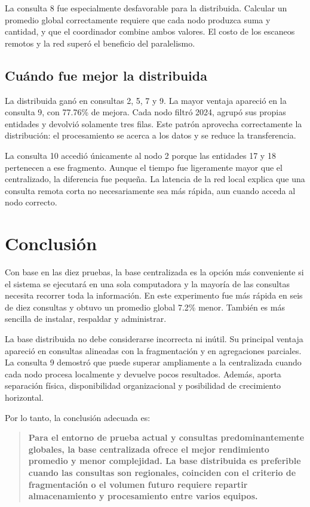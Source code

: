 \documentclass[12pt,letterpaper]{article}
\begin{document}
La consulta 8 fue especialmente desfavorable para la distribuida. Calcular un
promedio global correctamente requiere que cada nodo produzca suma y cantidad,
y que el coordinador combine ambos valores. El costo de los escaneos remotos y
la red superó el beneficio del paralelismo.

\subsection{Cuándo fue mejor la distribuida}

La distribuida ganó en consultas 2, 5, 7 y 9. La mayor ventaja apareció en la
consulta 9, con 77.76\% de mejora. Cada nodo filtró 2024, agrupó sus propias
entidades y devolvió solamente tres filas. Este patrón aprovecha correctamente
la distribución: el procesamiento se acerca a los datos y se reduce la
transferencia.

La consulta 10 accedió únicamente al nodo 2 porque las entidades 17 y 18
pertenecen a ese fragmento. Aunque el tiempo fue ligeramente mayor que el
centralizado, la diferencia fue pequeña. La latencia de la red local explica
que una consulta remota corta no necesariamente sea más rápida, aun cuando
acceda al nodo correcto.

\section{Conclusión}

Con base en las diez pruebas, la base centralizada es la opción más conveniente
si el sistema se ejecutará en una sola computadora y la mayoría de las
consultas necesita recorrer toda la información. En este experimento fue más
rápida en seis de diez consultas y obtuvo un promedio global 7.2\% menor.
También es más sencilla de instalar, respaldar y administrar.

La base distribuida no debe considerarse incorrecta ni inútil. Su principal
ventaja apareció en consultas alineadas con la fragmentación y en agregaciones
parciales. La consulta 9 demostró que puede superar ampliamente a la
centralizada cuando cada nodo procesa localmente y devuelve pocos resultados.
Además, aporta separación física, disponibilidad organizacional y posibilidad
de crecimiento horizontal.

Por lo tanto, la conclusión adecuada es:

\begin{quote}
\textbf{Para el entorno de prueba actual y consultas predominantemente
globales, la base centralizada ofrece el mejor rendimiento promedio y menor
complejidad. La base distribuida es preferible cuando las consultas son
regionales, coinciden con el criterio de fragmentación o el volumen futuro
requiere repartir almacenamiento y procesamiento entre varios equipos.}
\end{quote}
\end{document}
